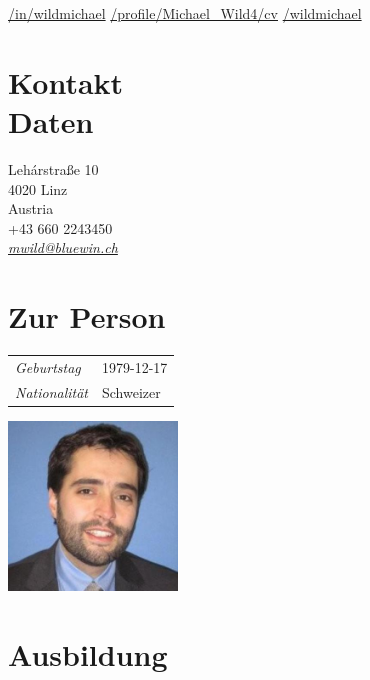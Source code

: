 \documentclass[line,11pt,a4paper]{../resume}
\newcommand{\mail}[1]{\textsl{\href{mailto:#1}{#1}}}
\begin{document}
\begin{resume}
\vspace{-4mm}
\-\hspace{-12.3mm}\begin{minipage}{15cm}
\href{https://linkedin.com/in/wildmichael}{\faLinkedinSquare/in/wildmichael}\quad
\href{https://xing.com/profile/Michael_Wild4/cv}{\faXingSquare/profile/Michael\_Wild4/cv}\quad
\href{https://github.com/wildmichael}{\faGithubSquare/wildmichael}
\end{minipage}

\begin{multicols}{2}

\section{\mysidestyle Kontakt\\Daten}\vspace{2mm}

Leh\'{a}rstra{\ss}e 10 \\
4020 Linz \\
Austria \\
+43 660 2243450 \\
\mail{mwild@bluewin.ch}

\section{\mysidestyle Zur Person}\vspace{2mm}

\begin{tabular}{@{}ll}
\textsl{Geburtstag} & 1979-12-17 \\
\textsl{Nationalität}   & Schweizer
\end{tabular}

\columnbreak
\vspace*{-9mm}\hfill\includegraphics[width=45mm]{../mwild}

\end{multicols}

\section{\mysidestyle Ausbildung}\vspace{2mm}


\end{resume}
\end{document}
